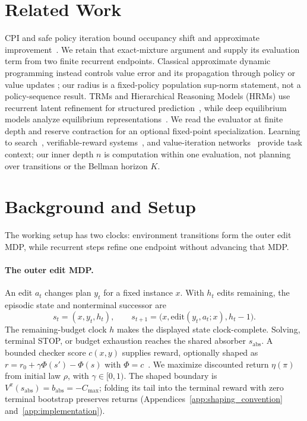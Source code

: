 \documentclass{article}
\theoremstyle{plain}
\theoremstyle{definition}
\theoremstyle{remark}
\begin{document}
\section{Related Work}
\label{sec:related_work}

CPI and safe policy iteration bound occupancy shift and approximate
improvement~\citep{KakadeLangford2002,Kakade2003Thesis,Pirotta2013SafePI,Metelli2021SafePI}.
We retain that exact-mixture argument and supply its evaluation term from two
finite recurrent endpoints. Classical approximate dynamic programming instead
controls value error and its propagation through policy or value updates
\citep{BertsekasTsitsiklis1996,Munos2003API,MunosSzepesvari2008,Scherrer2014};
our radius is a fixed-policy population sup-norm statement, not a policy-sequence
result. TRMs and Hierarchical Reasoning Models (HRMs) use recurrent latent
refinement for structured prediction~\citep{TRM2025,HRM2025}, while deep
equilibrium models analyze equilibrium
representations~\citep{Bai2019DEQ}. We read the evaluator at finite depth and
reserve contraction for an optional fixed-point specialization. Learning to
search~\citep{Daume2009SEARN,Ross2011DAgger,Chang2015LOLS}, verifiable-reward
systems~\citep{DeepSeekR1}, and value-iteration networks~\citep{Tamar2016VIN}
provide task context; our inner depth $n$ is computation within one evaluation,
not planning over transitions or the Bellman horizon $K$.


\section{Background and Setup}
\label{sec:setup}

The working setup has two clocks: environment transitions form the outer edit
MDP, while recurrent steps refine one endpoint without advancing that MDP.

\paragraph{The outer edit MDP.}
An edit $a_t$ changes plan $y_t$ for a fixed instance $x$. With $h_t$ edits
remaining, the episodic state and nonterminal successor are
\[
s_t=(x,y_t,h_t),\qquad
s_{t+1}=\bigl(x,\mathrm{edit}(y_t,a_t;x),h_t-1\bigr).
\]
The remaining-budget clock $h$ makes the displayed state clock-complete.
Solving, terminal STOP, or budget exhaustion reaches the shared absorber
$s_{\mathrm{abs}}$. A bounded checker
score $c(x,y)$ supplies reward, optionally shaped as
$r=r_0+\gamma\Phi(s')-\Phi(s)$ with $\Phi=c$~\citep{Ng1999Shaping}. We maximize
discounted return $\eta(\pi)$ from initial law $\rho$, with
$\gamma\in[0,1)$. The shaped boundary is
$V^\pi(s_{\mathrm{abs}})=b_{\mathrm{abs}}=-C_{\max}$; folding its tail into the terminal
reward with zero terminal bootstrap preserves returns
(Appendices~\ref{app:shaping_convention} and~\ref{app:implementation}).
\end{document}
